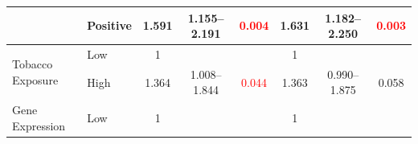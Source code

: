 \documentclass[
paper=landscape,
paper=160mm:90mm, %
fontsize=11pt, %
pagesize, %
parskip=half-, %
]{scrartcl} %
\theoremstyle{mythmstyle} %
\begin{document}
\begin{table}[H]
{\begin{tabular}{|l|l|c|c|c|c|c|c|}
\cline{2-8}
                                        & Positive                                                                            & 1.591                                                                          & 1.155--2.191                                                                   & \textcolor{red}{0.004}                                                        & 1.631                                                                          & 1.182--2.250                                                                   & \textcolor{red}{0.003}                                                         \\ 
\hline
\multirow{2}{*}{Tobacco Exposure}       & {\cellcolor[rgb]{0.62,0.812,0.878}}Low                                              & {\cellcolor[rgb]{0.62,0.812,0.878}}1                                           & {\cellcolor[rgb]{0.62,0.812,0.878}}                                           & {\cellcolor[rgb]{0.62,0.812,0.878}}                                           & {\cellcolor[rgb]{0.62,0.812,0.878}}1                                           & {\cellcolor[rgb]{0.62,0.812,0.878}}                                           & {\cellcolor[rgb]{0.62,0.812,0.878}}                                            \\ 
\cline{2-8}
                                        & High                                                                                & 1.364                                                                          & 1.008--1.844                                                                   & \textcolor{red}{0.044}                                                        & 1.363                                                                          & 0.990--1.875                                                                   & 0.058                                                                          \\ 
\hline
\multirow{2}{*}{Gene Expression}                & {\cellcolor[rgb]{0.62,0.812,0.878}}Low                                              & {\cellcolor[rgb]{0.62,0.812,0.878}}1                                           & {\cellcolor[rgb]{0.62,0.812,0.878}}                                           & {\cellcolor[rgb]{0.62,0.812,0.878}}                                           & {\cellcolor[rgb]{0.62,0.812,0.878}}1                                           & {\cellcolor[rgb]{0.62,0.812,0.878}}                                           & {\cellcolor[rgb]{0.62,0.812,0.878}}                                            \\ 

\end{tabular}}
\end{table}
\end{document}
